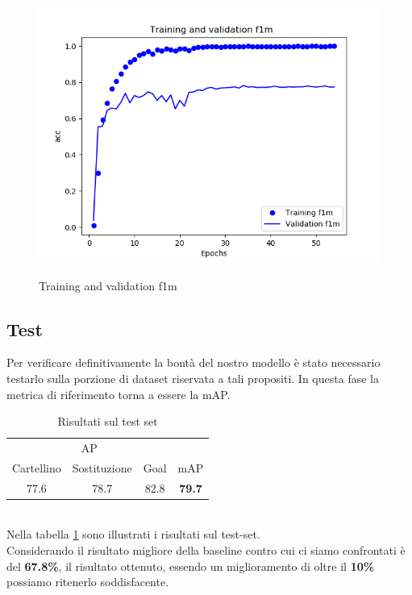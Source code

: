 \begin{figure}[ht]
\centering
\caption{Training and validation f1m}
\includegraphics[scale=0.7]{img/training-validation-f1m.png}
\label{figure : trainingvalf1}
\end{figure}
\subsection{Test}
Per verificare definitivamente la bontà del nostro modello è stato necessario testarlo sulla porzione di dataset riservata a tali propositi. In questa fase la metrica di riferimento torna a essere la mAP.
\begin{table}[ht]
\label{table: test}
\caption{Risultati sul test set}
\centering
\begin{tabular}{c|c|c||c}
\multicolumn{3}{c}{AP} & \multicolumn{1}{c}{}  \\
Cartellino & Sostituzione & Goal & mAP \\
\hline
77.6& 78.7 & 82.8 & \textbf{79.7} \\ [1ex]
\end{tabular}
\end{table}
\\Nella tabella \ref{table: test} sono illustrati i risultati sul test-set.
\\Considerando il risultato migliore della baseline contro cui ci siamo confrontati è del \textbf{67.8\%}, il 
risultato ottenuto, essendo un miglioramento di oltre il \textbf{10\%} possiamo ritenerlo soddisfacente.